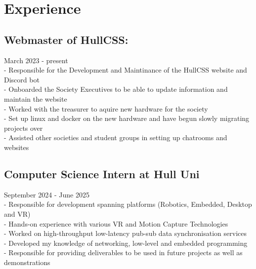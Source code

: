 \section{Experience}

\subsection{Webmaster of HullCSS:} March 2023 - present \\
\:-\: Responsible for the Development and Maintinance of the HullCSS website and Discord bot \\
\:-\: Onboarded the Society Executives to be able to update information and maintain the website \\
\:-\: Worked with the treasurer to aquire new hardware for the society \\
\:-\: Set up linux and docker on the new hardware and have begun slowly migrating projects over \\
\:-\: Assisted other societies and student groups in setting up chatrooms and websites \\

\subsection{Computer Science Intern at Hull Uni} September 2024 - June 2025 \\
\:-\: Responsible for development spanning platforms (Robotics, Embedded, Desktop and VR) \\
\:-\: Hands-on experience with various VR and Motion Capture Technologies \\
\:-\: Worked on high-throughput low-latency pub-sub data synchronisation services \\
\:-\: Developed my knowledge of networking, low-level and embedded programming \\
\:-\: Responsible for providing deliverables to be used in future projects as well as demonstrations \\
